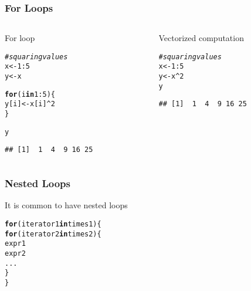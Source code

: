 \documentclass[12pt]{beamer}\usepackage[]{graphicx}\usepackage[]{color}
\makeatletter
\newcommand{\hlnum}[1]{\textcolor[rgb]{0.686,0.059,0.569}{#1}}%
\newcommand{\hlcom}[1]{\textcolor[rgb]{0.678,0.584,0.686}{\textit{#1}}}%
\newcommand{\hlopt}[1]{\textcolor[rgb]{0,0,0}{#1}}%
\newcommand{\hlstd}[1]{\textcolor[rgb]{0.345,0.345,0.345}{#1}}%
\newcommand{\hlkwa}[1]{\textcolor[rgb]{0.161,0.373,0.58}{\textbf{#1}}}%
\newcommand{\hlkwb}[1]{\textcolor[rgb]{0.69,0.353,0.396}{#1}}%
\newenvironment{kframe}{%
 \def\at@end@of@kframe{}%
 \ifinner\ifhmode%
  \def\at@end@of@kframe{\end{minipage}}%
  \begin{minipage}{\columnwidth}%
 \fi\fi%
 \def\FrameCommand##1{\hskip\@totalleftmargin \hskip-\fboxsep
 \colorbox{shadecolor}{##1}\hskip-\fboxsep
     \hskip-\linewidth \hskip-\@totalleftmargin \hskip\columnwidth}%
 \MakeFramed {\advance\hsize-\width
   \@totalleftmargin\z@ \linewidth\hsize
   \@setminipage}}%
 {\par\unskip\endMakeFramed%
 \at@end@of@kframe}
\newenvironment{knitrout}{}{} %
\makeatother
\begin{document}
\begin{frame}[fragile]
\frametitle{For Loops}

\begin{columns}[t]
\begin{column}{0.45\textwidth}
For loop
\begin{knitrout}\footnotesize
{}\color{fgcolor}\begin{kframe}
\begin{alltt}
\hlcom{# squaring values}
\hlstd{x} \hlkwb{<-} \hlnum{1}\hlopt{:}\hlnum{5}
\hlstd{y} \hlkwb{<-} \hlstd{x}

\hlkwa{for} \hlstd{(i} \hlkwa{in} \hlnum{1}\hlopt{:}\hlnum{5}\hlstd{) \{}
  \hlstd{y[i]} \hlkwb{<-} \hlstd{x[i]}\hlopt{^}\hlnum{2}
\hlstd{\}}

\hlstd{y}
\end{alltt}
\begin{verbatim}
## [1]  1  4  9 16 25
\end{verbatim}
\end{kframe}
\end{knitrout}
\end{column}

\begin{column}{0.45\textwidth}
Vectorized computation
\begin{knitrout}\footnotesize
{}\color{fgcolor}\begin{kframe}
\begin{alltt}
\hlcom{# squaring values}
\hlstd{x} \hlkwb{<-} \hlnum{1}\hlopt{:}\hlnum{5}
\hlstd{y} \hlkwb{<-} \hlstd{x}\hlopt{^}\hlnum{2}
\hlstd{y}
\end{alltt}
\begin{verbatim}
## [1]  1  4  9 16 25
\end{verbatim}
\end{kframe}
\end{knitrout}
\end{column}
\end{columns}

\end{frame}


\begin{frame}[fragile]
\frametitle{Nested Loops}

It is common to have nested loops
\begin{knitrout}\footnotesize
{}\color{fgcolor}\begin{kframe}
\begin{alltt}
\hlkwa{for} \hlstd{(iterator1} \hlkwa{in} \hlstd{times1) \{}
  \hlkwa{for} \hlstd{(iterator2} \hlkwa{in} \hlstd{times2) \{}
    \hlstd{expr1}
    \hlstd{expr2}
    \hlstd{...}
  \hlstd{\}}
\hlstd{\}}
\end{alltt}
\end{kframe}
\end{knitrout}

\end{frame}
\end{document}
